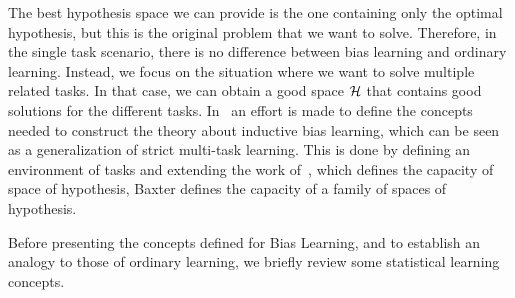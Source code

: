 The best hypothesis space we can provide is the one containing only the optimal hypothesis, but this is the original problem that we want to solve. Therefore, in the single task scenario, there is no difference between bias learning and ordinary learning.
Instead, we focus on the situation where we want to solve multiple related tasks. In that case, we can obtain a good space $\mathcal{H}$ that contains good solutions for the different tasks.
%
In~\cite{baxter2000model} an effort is made to define the concepts needed to construct the theory about inductive bias learning, which can be seen as a generalization of strict multi-task learning. This is done by defining an environment of tasks and extending the work of~\cite{vapnik2013nature}, which defines the capacity of space of hypothesis, Baxter defines the capacity of a family of spaces of hypothesis.

Before presenting the concepts defined for Bias Learning, and to establish an analogy to those of ordinary learning, we briefly review some statistical learning concepts.
